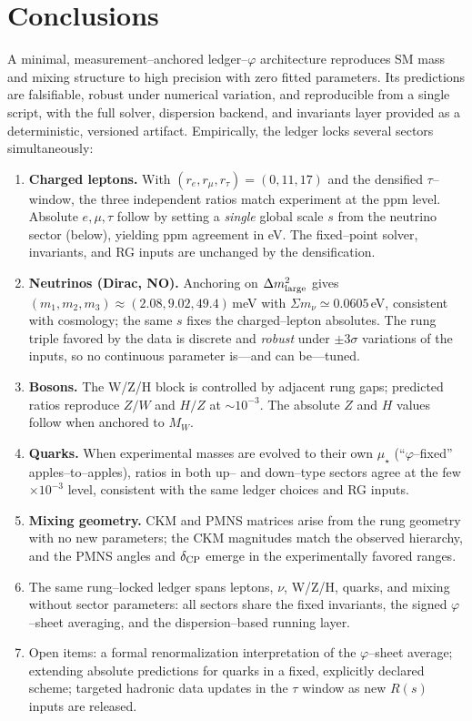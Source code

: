 \documentclass[%
  amsmath,amssymb,
  aps,
 prb,
 floatfix, showkeys
 ]{revtex4-2}
\begin{document}
 \vspace{-1.0cm}
 
 \section{Conclusions}
 \label{sec:conclude}
 
 A minimal, measurement–anchored ledger–$\varphi$ architecture reproduces SM mass and mixing structure to high precision with zero fitted parameters. Its predictions are falsifiable, robust under numerical variation, and reproducible from a single script, with the full solver, dispersion backend, and invariants layer provided as a deterministic, versioned artifact.
 Empirically, the ledger locks several sectors simultaneously:
 \begin{enumerate}
   \item \textbf{Charged leptons.} With $(r_e,r_\mu,r_\tau)=(0,11,17)$ and the densified $\tau$--window, the three independent ratios match experiment at the ppm level. Absolute $e,\mu,\tau$ follow by setting a \emph{single} global scale $s$ from the neutrino sector (below), yielding ppm agreement in eV. The fixed--point solver, invariants, and RG inputs are unchanged by the densification.
   \item \textbf{Neutrinos (Dirac, NO).} Anchoring on $\Delta m^2_{\rm large}$ gives $(m_1,m_2,m_3)\approx(2.08,9.02,49.4)$\,meV with $\Sigma m_\nu\simeq0.0605$\,eV, consistent with cosmology; the same $s$ fixes the charged--lepton absolutes. The rung triple favored by the data is discrete and \emph{robust} under $\pm 3\sigma$ variations of the inputs, so no continuous parameter is—and can be—tuned.
   \item \textbf{Bosons.} The W/Z/H block is controlled by adjacent rung gaps; predicted ratios reproduce $Z/W$ and $H/Z$ at $\sim10^{-3}$. The absolute $Z$ and $H$ values follow when anchored to $M_W$. 
   \item \textbf{Quarks.} When experimental masses are evolved to their own $\mu_\star$ (``$\varphi$--fixed'' apples--to--apples), ratios in both up-- and down--type sectors agree at the few$\times10^{-3}$ level, consistent with the same ledger choices and RG inputs. 
   \item \textbf{Mixing geometry.} CKM and PMNS matrices arise from the rung geometry with no new parameters; the CKM magnitudes match the observed hierarchy, and the PMNS angles and $\delta_{\rm CP}$ emerge in the experimentally favored ranges.
   \item The same rung–locked ledger spans leptons, $\nu$, W/Z/H, quarks, and mixing without sector parameters: all sectors share the fixed invariants, the signed $\varphi$–sheet averaging, and the dispersion–based running layer.
   \item Open items: a formal renormalization interpretation of the $\varphi$–sheet average; extending absolute predictions for quarks in a fixed, explicitly declared scheme; targeted hadronic data updates in the $\tau$ window as new $R(s)$ inputs are released.
 \end{enumerate}
 
\end{document}
